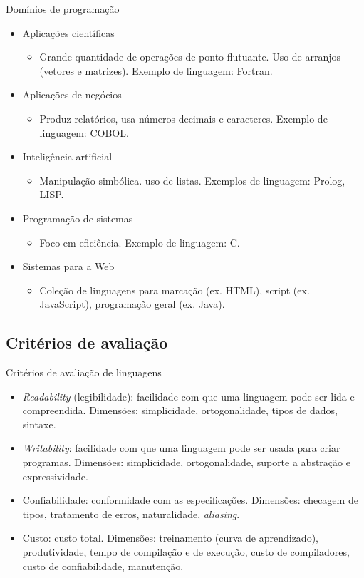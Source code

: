 \documentclass[handout, aspectratio=169]{beamer}
\begin{document}
\begin{frame}{Domínios de programação}

\begin{itemize}
    \item Aplicações científicas
    \begin{itemize}
    \item Grande quantidade de operações de ponto-flutuante. Uso de arranjos (vetores e matrizes). Exemplo de linguagem: Fortran.
    \end{itemize}
    \item Aplicações de negócios
    \begin{itemize}
    \item Produz relatórios, usa números decimais e caracteres. Exemplo de linguagem: COBOL.
    \end{itemize}
    \item Inteligência artificial
    \begin{itemize}
    \item Manipulação simbólica. uso de listas. Exemplos de linguagem: Prolog, LISP.
    \end{itemize}
    \item Programação de sistemas
    \begin{itemize}
    \item Foco em eficiência. Exemplo de linguagem: C.
    \end{itemize}
    \item Sistemas para a Web
    \begin{itemize}
    \item Coleção de linguagens para marcação (ex. HTML), script (ex. JavaScript), programação geral (ex. Java).
    \end{itemize}
\end{itemize}
\end{frame}


\subsection{Critérios de avaliação}

\begin{frame}{Critérios de avaliação de linguagens}

\begin{itemize}
\item \textit{Readability} (legibilidade): facilidade com que uma linguagem pode ser lida e compreendida. Dimensões: simplicidade, ortogonalidade, tipos de dados, sintaxe.
\item \textit{Writability}: facilidade com que uma linguagem pode ser usada para criar programas. Dimensões: simplicidade, ortogonalidade, suporte a abstração e expressividade.
\item Confiabilidade: conformidade com as especificações. Dimensões: checagem de tipos, tratamento de erros, naturalidade, \textit{aliasing}.
\item Custo: custo total. Dimensões: treinamento (curva de aprendizado), produtividade, tempo de compilação e de execução, custo de compiladores, custo de confiabilidade, manutenção.
\end{itemize}
\end{frame}
\end{document}
